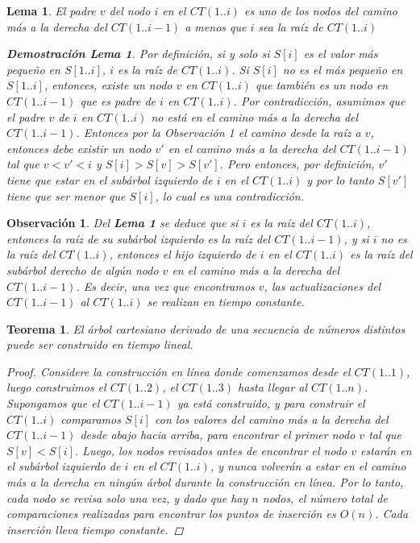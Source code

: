 \documentclass[12pt]{article}
\newcommand{\ct}{árbol cartesiano }
\newcommand{\rmp}{camino más a la derecha }
\newtheorem{theorem}{Teorema}
\newtheorem{lemma}{Lema}
\newtheorem{proof}{Demostración}
\newtheorem{prooflemma}{Demostración Lema}
\newtheorem{observation}{Observación}
\begin{document}
\begin{lemma}
	El padre $v$ del nodo $i$ en el $CT(1..i)$ es uno de los nodos del \rmp del $CT(1..i-1)$ a menos que $i$ sea la raíz de $CT(1..i)$
	\begin{prooflemma}
		Por definición, si y solo si $S[i]$ es el valor más pequeño en $S[1..i]$, $i$ es la raíz de $CT(1..i)$. Si $S[i]$ no es el más pequeño en $S[1..i]$, entonces, existe un nodo $v$ en $CT(1..i)$ que también es un nodo en $CT(1..i-1)$ que es padre de $i$ en $CT(1..i)$. Por contradicción, asumimos que el padre $v$ de $i$ en $CT(1..i)$ no está en el \rmp del $CT(1..i-1)$. Entonces por la Observación 1 el camino desde la raíz a $v$, entonces debe existir un nodo $v'$ en el \rmp del $CT(1..i-1)$ tal que $v < v' < i$ y $S[i] > S[v] > S[v']$. Pero entonces, por definición, $v'$ tiene que estar en el subárbol izquierdo de $i$ en el $CT(1..i)$ y por lo tanto $S[v']$ tiene que ser menor que $S[i]$, lo cual es una contradicción.
	\end{prooflemma}
\end{lemma}

\begin{observation}
	Del \textbf{Lema 1} se deduce que si $i$ es la raíz del $CT(1..i)$, entonces la raíz de su subárbol izquierdo es la raíz del $CT(1..i-1)$, y si $i$ no es la raíz del $CT(1..i)$, entonces el hijo izquierdo de $i$ en el $CT(1..i)$ es la raíz del subárbol derecho de algún nodo $v$ en el \rmp del $CT(1..i-1)$. Es decir, una vez que encontramos $v$, las actualizaciones del $CT(1..i-1)$ al $CT(1..i)$ se realizan en tiempo constante.
\end{observation}

\begin{theorem}
	El \ct derivado de una secuencia de números distintos puede ser construido en tiempo lineal.
	\begin{proof}
		Considere la construcción en línea donde comenzamos desde el $CT(1..1)$, luego construimos el $CT(1..2)$, el $CT(1..3)$ hasta llegar al $CT(1..n)$. Supongamos que el $CT(1..i-1)$ ya está construido, y para construir el $CT(1..i)$ comparamos $S[i]$ con los valores del camino más a la derecha del $CT(1..i-1)$ desde abajo hacia arriba, para encontrar el primer nodo $v$ tal que $S[v] < S[i]$. Luego, los nodos revisados antes de encontrar el nodo $v$ estarán en el subárbol izquierdo de $i$ en el $CT(1..i)$, y nunca volverán a estar en el camino más a la derecha en ningún árbol durante la construcción en línea. Por lo tanto, cada nodo se revisa solo una vez, y dado que hay $n$ nodos, el número total de comparaciones realizadas para encontrar los puntos de inserción es $O(n)$. Cada inserción lleva tiempo constante.
	\end{proof}
\end{theorem}
\end{document}
